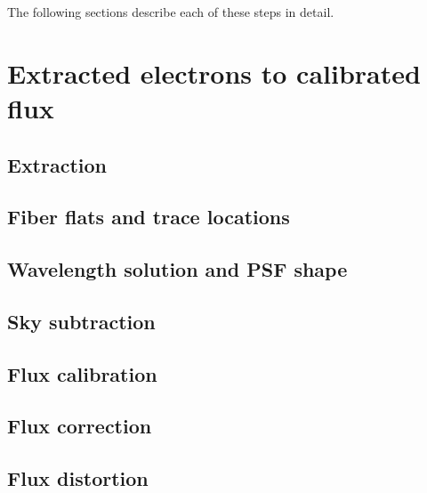 \documentclass[12pt]{article}
\begin{document}
The following sections describe each of these steps in detail.

\section{Extracted electrons to calibrated flux}

\subsection{Extraction}

\subsection{Fiber flats and trace locations}

\subsection{Wavelength solution and PSF shape}

\subsection{Sky subtraction}

\subsection{Flux calibration}

\subsection{Flux correction}

\subsection{Flux distortion}
\end{document}
